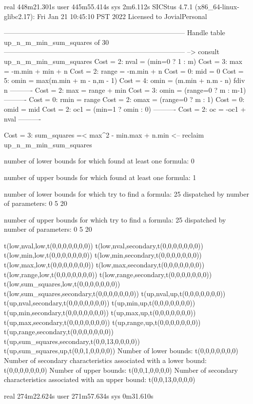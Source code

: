 real	448m21.301s
user	445m55.414s
sys	2m6.112s
SICStus 4.7.1 (x86_64-linux-glibc2.17): Fri Jan 21 10:45:10 PST 2022
Licensed to JovialPersonal


--------------------------------------------------------------------------------
Handle table up_n_m_min_sum_squares of 30
--------------------------------------------------------------------------------
--> consult up_n_m_min_sum_squares
Cost =  2:  nval  = (min=0 ? 1 : m)
Cost =  3:  max   = -m.min + min + n
Cost =  2:  range = -m.min + n
Cost =  0:  mid   = 0
Cost =  5:  omin  = max(m.min + m - n,m - 1)
Cost =  4:  omin  = (m.min + n.m - n) fdiv n
----------
Cost =  2:  max   = range + min
Cost =  3:  omin  = (range=0 ? m : m-1)
----------
Cost =  0:  rmin  = range
Cost =  2:  omax  = (range=0 ? m : 1)
Cost =  0:  omid  = mid
Cost =  2:  oc1   = (min=1 ? omin : 0)
----------
Cost =  2:  oc    = -oc1 + nval
----------

Cost =  3:  sum_squares =< max^2 - min.max + n.min
<-- reclaim up_n_m_min_sum_squares

number of lower bounds for which found at least one formula: 0

number of upper bounds for which found at least one formula: 1

number of lower bounds for which try to find a formula: 25
dispatched by number of parameters: 0  5  20

number of upper bounds for which try to find a formula: 25
dispatched by number of parameters: 0  5  20

t(low,nval,low,t(0,0,0,0,0,0,0))
t(low,nval,secondary,t(0,0,0,0,0,0,0))
t(low,min,low,t(0,0,0,0,0,0,0))
t(low,min,secondary,t(0,0,0,0,0,0,0))
t(low,max,low,t(0,0,0,0,0,0,0))
t(low,max,secondary,t(0,0,0,0,0,0,0))
t(low,range,low,t(0,0,0,0,0,0,0))
t(low,range,secondary,t(0,0,0,0,0,0,0))
t(low,sum_squares,low,t(0,0,0,0,0,0,0))
t(low,sum_squares,secondary,t(0,0,0,0,0,0,0))
t(up,nval,up,t(0,0,0,0,0,0,0))
t(up,nval,secondary,t(0,0,0,0,0,0,0))
t(up,min,up,t(0,0,0,0,0,0,0))
t(up,min,secondary,t(0,0,0,0,0,0,0))
t(up,max,up,t(0,0,0,0,0,0,0))
t(up,max,secondary,t(0,0,0,0,0,0,0))
t(up,range,up,t(0,0,0,0,0,0,0))
t(up,range,secondary,t(0,0,0,0,0,0,0))
t(up,sum_squares,secondary,t(0,0,13,0,0,0,0))
t(up,sum_squares,up,t(0,0,1,0,0,0,0))
Number of lower bounds:                                             t(0,0,0,0,0,0,0)
Number of secondary characteristics associated with a lower bound:  t(0,0,0,0,0,0,0)
Number of upper bounds:                                             t(0,0,1,0,0,0,0)
Number of secondary characteristics associated with an upper bound: t(0,0,13,0,0,0,0)

real	274m22.624s
user	271m57.634s
sys	0m31.610s
